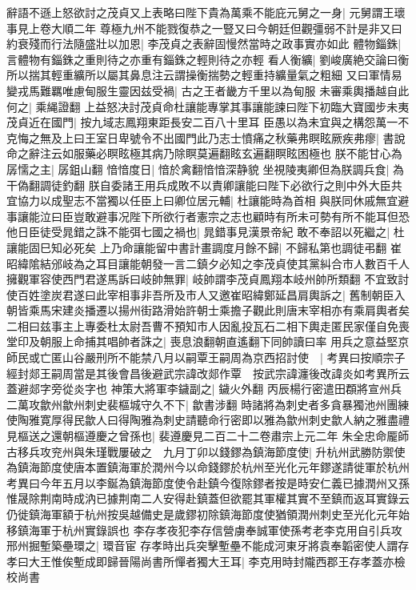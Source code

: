 辭語不遜上怒欲討之茂貞又上表略曰陛下貴為萬乘不能庇元舅之一身|{
	元舅謂王瓌事見上卷大順二年}
尊極九州不能戮復恭之一豎又曰今朝廷但觀彊弱不計是非又曰約衰殘而行法隨盛壯以加恩|{
	李茂貞之表辭固慢然當時之政事實亦如此}
體物錙銖|{
	言體物有錙銖之重則待之亦重有錙銖之輕則待之亦輕}
看人衡纊|{
	劉峻廣絶交論曰衡所以揣其輕重纊所以屬其鼻息注云謂操衡揣勢之輕重持纊量氣之粗細}
又曰軍情易變戎馬難羈唯慮甸服生靈因兹受禍|{
	古之王者畿方千里以為甸服}
未審乘輿播越自此何之|{
	乘䋲證翻}
上益怒决討茂貞命杜讓能專掌其事讓能諫曰陛下初臨大寶國步未夷茂貞近在國門|{
	按九域志鳳翔東距長安二百八十里耳}
臣愚以為未宜與之構怨萬一不克悔之無及上曰王室日卑號令不出國門此乃志士憤痛之秋藥弗瞑眩厥疾弗瘳|{
	書說命之辭注云如服藥必瞑眩極其病乃除瞑莫遍翻眩玄遍翻瞑眩困極也}
朕不能甘心為孱懦之主|{
	孱鉏山翻}
愔愔度日|{
	愔於禽翻愔愔深静貌}
坐視陵夷卿但為朕調兵食|{
	為干偽翻調徒釣翻}
朕自委諸王用兵成敗不以責卿讓能曰陛下必欲行之則中外大臣共宜協力以成聖志不當獨以任臣上曰卿位居元輔|{
	杜讓能時為首相}
與朕同休戚無宜避事讓能泣曰臣豈敢避事况陛下所欲行者憲宗之志也顧時有所未可勢有所不能耳但恐他日臣徒受晁錯之誅不能弭七國之禍也|{
	晁錯事見漢景帝紀}
敢不奉詔以死繼之|{
	杜讓能固巳知必死矣}
上乃命讓能留中書計畫調度月餘不歸|{
	不歸私第也調徒弔翻}
崔昭緯隂結邠岐為之耳目讓能朝發一言二鎮夕必知之李茂貞使其黨糾合市人數百千人擁觀軍容使西門君遂馬訴曰岐帥無罪|{
	岐帥謂李茂貞鳳翔本岐州帥所類翻}
不宜致討使百姓塗炭君遂曰此宰相事非吾所及市人又邀崔昭緯鄭延昌肩輿訴之|{
	舊制朝臣入朝皆乘馬宋建炎播遷以揚州街路滑始許朝士乘擔子觀此則唐末宰相亦有乘肩輿者矣}
二相曰兹事主上專委杜太尉吾曹不預知市人因亂投瓦石二相下輿走匿民家僅自免喪堂印及朝服上命捕其唱帥者誅之|{
	喪息浪翻朝直遙翻下同帥讀曰率}
用兵之意益堅京師民或亡匿山谷嚴刑所不能禁八月以嗣覃王嗣周為京西招討使　|{
	考異曰按順宗子經封郯王嗣周當是其後會昌後避武宗諱改郯作覃　按武宗諱瀍後改諱炎如考異所云蓋避郯字旁從炎字也}
神策大將軍李鐬副之|{
	鐬火外翻}
丙辰楊行密遣田頵將宣州兵二萬攻歙州歙州刺史裴樞城守久不下|{
	歙書涉翻}
時諸將為刺史者多貪暴獨池州團練使陶雅寛厚得民歙人曰得陶雅為刺史請聽命行密即以雅為歙州刺史歙人納之雅盡禮見樞送之還朝樞遵慶之曾孫也|{
	裴遵慶見二百二十二卷肅宗上元二年}
朱全忠命龎師古移兵攻兖州與朱瑾戰屢破之　九月丁卯以錢鏐為鎮海節度使|{
	升杭州武勝防禦使為鎮海節度使唐本置鎮海軍於潤州今以命錢鏐於杭州至光化元年鏐遂請徙軍於杭州　考異曰今年五月以李鋋為鎮海節度使令赴鎮今復除鏐者按是時安仁義已據潤州又孫惟晟除荆南時成汭已據荆南二人安得赴鎮蓋但欲罷其軍權其實不至鎮而返耳實錄云仍徙鎮海軍額于杭州按吳越備史是歲鏐初除鎮海節度使猶領潤州刺史至光化元年始移鎮海軍于杭州實錄誤也}
李存孝夜犯李存信營虜奉誠軍使孫考老李克用自引兵攻邢州掘塹築壘環之|{
	環音宦}
存孝時出兵突擊塹壘不能成河東牙將袁奉韜密使人謂存孝曰大王惟俟塹成即歸晉陽尚書所憚者獨大王耳|{
	李克用時封隴西郡王存孝蓋亦檢校尚書}
